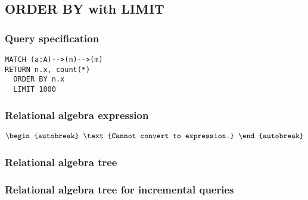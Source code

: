 
\subsection{ORDER BY with LIMIT}

\subsubsection*{Query specification}

\begin{lstlisting}
MATCH (a:A)-->(n)-->(m)
RETURN n.x, count(*)
  ORDER BY n.x
  LIMIT 1000
\end{lstlisting}

\subsubsection*{Relational algebra expression}

\begin{align*}
\begin{autobreak}
\text{Cannot convert to expression.}
\end{autobreak}
\end{align*}

\subsubsection*{Relational algebra tree}


\subsubsection*{Relational algebra tree for incremental queries}

